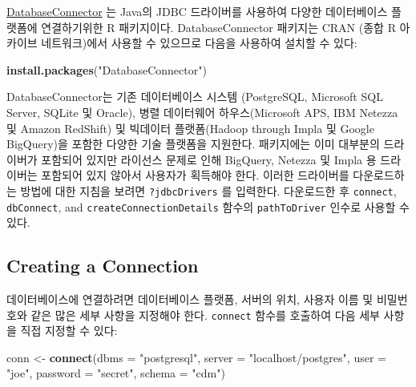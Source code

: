 \documentclass[11pt]{book}
\newenvironment{Shaded}{\begin{snugshade}}{\end{snugshade}}
\newcommand{\KeywordTok}[1]{\textcolor[rgb]{0.13,0.29,0.53}{\textbf{#1}}}
\newcommand{\DataTypeTok}[1]{\textcolor[rgb]{0.13,0.29,0.53}{#1}}
\newcommand{\StringTok}[1]{\textcolor[rgb]{0.31,0.60,0.02}{#1}}
\newcommand{\NormalTok}[1]{#1}
\theoremstyle{definition}
\theoremstyle{definition}
\theoremstyle{definition}
\theoremstyle{remark}
\begin{document}
\href{https://ohdsi.github.io/DatabaseConnector/}{DatabaseConnector} 는
Java의 JDBC 드라이버를 사용하여 다양한 데이터베이스 플랫폼에
연결하기위한 R 패키지이다. DatabaseConnector 패키지는 CRAN (종합 R
아카이브 네트워크)에서 사용할 수 있으므로 다음을 사용하여 설치할 수
있다:

\begin{Shaded}
\begin{Highlighting}[]
\KeywordTok{install.packages}\NormalTok{(}\StringTok{"DatabaseConnector"}\NormalTok{)}
\end{Highlighting}
\end{Shaded}

DatabaseConnector는 기존 데이터베이스 시스템 (PostgreSQL, Microsoft SQL
Server, SQLite 및 Oracle), 병렬 데이터웨어 하우스(Microsoft APS, IBM
Netezza 및 Amazon RedShift) 및 빅데이터 플랫폼(Hadoop through Impla 및
Google BigQuery)을 포함한 다양한 기술 플랫폼을 지원한다. 패키지에는 이미
대부분의 드라이버가 포함되어 있지만 라이선스 문제로 인해 BigQuery,
Netezza 및 Impla 용 드라이버는 포함되어 있지 않아서 사용자가 획득해야
한다. 이러한 드라이버를 다운로드하는 방법에 대한 지침을 보려면
\texttt{?jdbcDrivers} 를 입력한다. 다운로드한 후 \texttt{connect},
\texttt{dbConnect}, and \texttt{createConnectionDetails} 함수의
\texttt{pathToDriver} 인수로 사용할 수 있다.

\subsection{Creating a Connection}\label{creating-a-connection}

데이터베이스에 연결하려면 데이터베이스 플랫폼, 서버의 위치, 사용자 이름
및 비밀번호와 같은 많은 세부 사항을 지정해야 한다. \texttt{connect}
함수를 호출하여 다음 세부 사항을 직접 지정할 수 있다:

\begin{Shaded}
\begin{Highlighting}[]
\NormalTok{conn <-}\StringTok{ }\KeywordTok{connect}\NormalTok{(}\DataTypeTok{dbms =} \StringTok{"postgresql"}\NormalTok{,}
                \DataTypeTok{server =} \StringTok{"localhost/postgres"}\NormalTok{,}
                \DataTypeTok{user =} \StringTok{"joe"}\NormalTok{,}
                \DataTypeTok{password =} \StringTok{"secret"}\NormalTok{,}
                \DataTypeTok{schema =} \StringTok{"cdm"}\NormalTok{)}
\end{Highlighting}
\end{Shaded}
\end{document}
